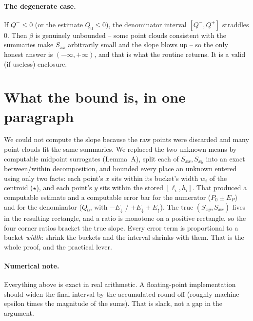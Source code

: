 \documentclass[11pt]{article}
\begin{document}
\paragraph{The degenerate case.}
If $Q^-\le 0$ (or the estimate $Q_0\le 0$), the denominator interval
$[Q^-,Q^+]$ straddles $0$. Then $\beta$ is genuinely unbounded -- some
point clouds consistent with the summaries make $S_{xx}$ arbitrarily
small and the slope blows up -- so the only honest answer is
$(-\infty,+\infty)$, and that is what the routine returns. It is a
valid (if useless) enclosure.

\section{What the bound is, in one paragraph}

We could not compute the slope because the raw points were discarded
and many point clouds fit the same summaries. We replaced the two
unknown means by computable midpoint surrogates (Lemma~A), split each
of $S_{xx},S_{xy}$ into an exact between/within decomposition, and
bounded every place an unknown entered using only two facts: each
point's $x$ sits within its bucket's width $w_i$ of the centroid
($\star$), and each point's $y$ sits within the stored
$[\ell_i,h_i]$. That produced a computable estimate and a computable
error bar for the numerator ($P_0\pm E_P$) and for the denominator
($Q_0$, with $-E_\downarrow$ / $+E_\downarrow+E_\uparrow$). The true
$(S_{xy},S_{xx})$ lives in the resulting rectangle, and a ratio is
monotone on a positive rectangle, so the four corner ratios bracket
the true slope. Every error term is proportional to a bucket
\emph{width}: shrink the buckets and the interval shrinks with them.
That is the whole proof, and the practical lever.

\paragraph{Numerical note.}
Everything above is exact in real arithmetic. A floating-point
implementation should widen the final interval by the accumulated
round-off (roughly machine epsilon times the magnitude of the sums).
That is slack, not a gap in the argument.
\end{document}
